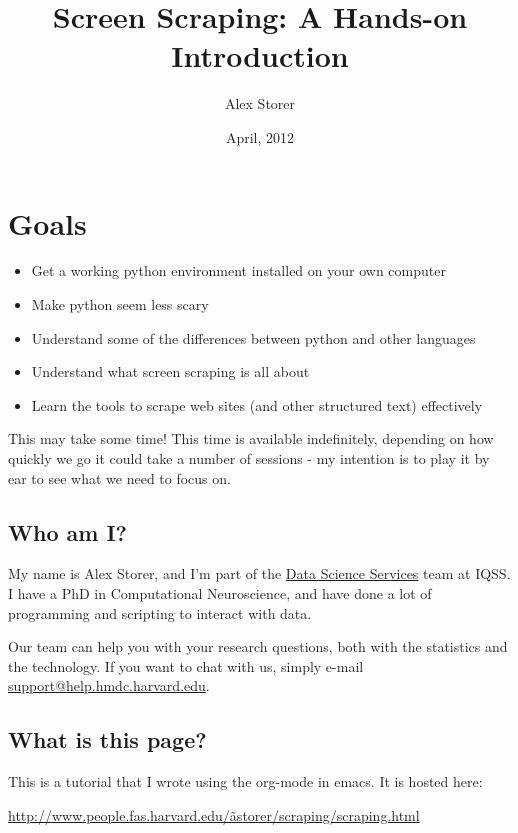 \documentclass[11pt]{article}
\title{Screen Scraping: A Hands-on Introduction}
\author{Alex Storer}
\date{April, 2012}
\begin{document}
\maketitle

\setcounter{tocdepth}{3}
\tableofcontents
\vspace*{1cm}




\section{Goals}
\label{sec-1}

\begin{itemize}
\item Get a working python environment installed on your own computer
\item Make python seem less scary
\item Understand some of the differences between python and other languages
\item Understand what screen scraping is all about
\item Learn the tools to scrape web sites (and other structured text)
  effectively
\end{itemize}

This may take some time!  This time is available indefinitely,
depending on how quickly we go it could take a number of sessions -
my intention is to play it by ear to see what we need to focus on.
\subsection{Who am I?}
\label{sec-1-1}


My name is Alex Storer, and I'm part of the \href{http://dss.iq.harvard.edu}{Data Science Services} team at IQSS.  I have a PhD in Computational Neuroscience,
and have done a lot of programming and scripting to interact with
data.

Our team can help you with your research questions, both with the
statistics and the technology.  If you want to chat with us, simply
e-mail \hyperref[support-help.hmdc.harvard.edu]{support@help.hmdc.harvard.edu}.
\subsection{What is this page?}
\label{sec-1-2}


This is a tutorial that I wrote using the org-mode in emacs.  It is
hosted here:

\href{http://www.people.fas.harvard.edu/~astorer/scraping/scraping.html}{http://www.people.fas.harvard.edu/\~astorer/scraping/scraping.html}
\end{document}
